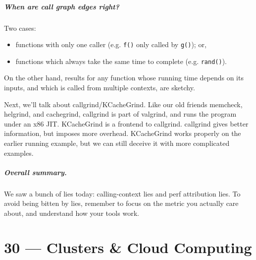 \documentclass[a4paper]{report}
\begin{document}
\paragraph{When are call graph edges right?}
Two cases:
\vspace*{-1em}
    \begin{itemize}[noitemsep]
    \item functions with only one caller
      (e.g. {\tt f()} only called by {\tt g()}); or,
    \item functions which always take the same time to complete
      (e.g. {\tt rand()}).
    \end{itemize}
\vspace*{-1em}

On the other hand, results for any function whose running time depends on its inputs,
and which is called from multiple contexts, are sketchy.


Next, we'll talk about callgrind/KCacheGrind. Like our old friends memcheck, helgrind, and cachegrind, callgrind is part of valgrind, and runs the program under an x86 JIT.  KCacheGrind is a frontend to callgrind. callgrind gives better information, but imposes
more overhead.
KCacheGrind works properly on the earlier running example, but we can still deceive it with more complicated examples.




\paragraph{Overall summary.} We saw a bunch of lies today: calling-context lies and perf attribution
lies. To avoid being bitten by lies, remember to focus on the metric you actually care about,
and understand how your tools work.










\chapter*{30 --- Clusters \& Cloud Computing}
\end{document}
